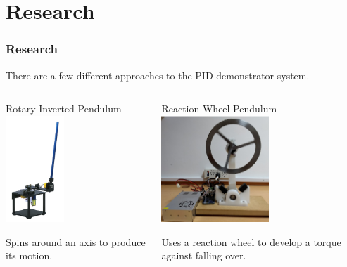 \documentclass[aspectratio=169]{beamer}
\begin{document}
\section{Research}
\begin{frame}
    \frametitle{Research}

    There are a few different approaches to the PID demonstrator system.

    \begin{columns}

    \begin{column}{0.48\textwidth}
        \begin{block}{Rotary Inverted Pendulum}
             \includegraphics[height=4cm]{RotaryInvertedPendulum}
        \end{block}
        Spins around an axis to produce its motion.
    \end{column}

    \begin{column}{0.48\textwidth}
        \begin{block}{Reaction Wheel Pendulum}
                \includegraphics[height=4cm]{ReactionWheel}
        \end{block}
        Uses a reaction wheel to develop a torque against falling over.
    \end{column}
\end{columns}


\end{frame}
\end{document}
